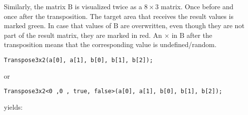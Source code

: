 Similarly, the matrix $\textrm{B}$ is visualized twice as a $8 \times 3$ matrix.
Once before and once after the transposition.
The target area that receives the result values is marked green.
In case that values of $\textrm{B}$ are overwritten, even though they are not part of the result matrix, they are marked in red.
An $\times$ in $\textrm{B}$ after the transposition means that the corresponding value is undefined/random.


\vspace{1cm}
\begin{minipage}{\linewidth}
\begin{verbatim}
Transpose3x2(a[0], a[1], b[0], b[1], b[2]);
\end{verbatim}
or 
\begin{verbatim}
Transpose3x2<0 ,0 , true, false>(a[0], a[1], b[0], b[1], b[2]);
\end{verbatim}
yields:


\end{minipage}

